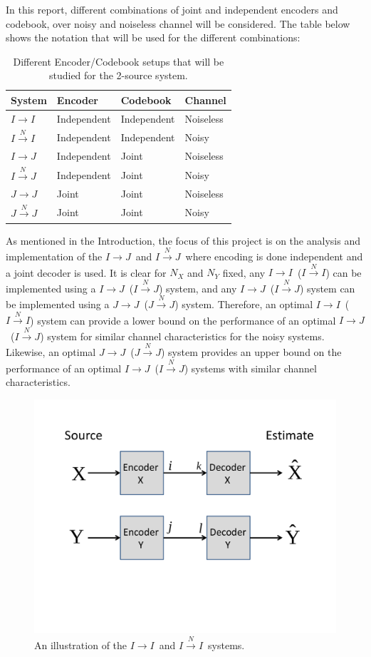 \documentclass[10pt,twoside,titlepage]{article}
\newcommand{\sysIIN}{\mbox{$I \overset{N}{\rightarrow} I$}}
\newcommand{\sysII}{\mbox{$I \rightarrow I$}}
\newcommand{\sysIJN}{\mbox{$I \overset{N}{\rightarrow} J$}}
\newcommand{\sysIJ}{\mbox{$I \rightarrow J$}}
\newcommand{\sysJJN}{\mbox{$J \overset{N}{\rightarrow} J$}}
\newcommand{\sysJJ}{\mbox{$J \rightarrow J$}}
\begin{document}
In this report, different combinations of joint and independent encoders and codebook, over noisy and noiseless channel will be considered. The table below shows the notation that will be used for the different combinations:

\begin{table}
\begin{center}
    \begin{tabular}{| l | l | l | l |}
    \hline
    \bf System & \bf Encoder & \bf Codebook & \bf Channel \\ \hline \hline
    \sysII & Independent & Independent & Noiseless \\ \hline
    \sysIIN & Independent & Independent & Noisy \\ \hline
    \sysIJ & Independent & Joint & Noiseless \\ \hline
    \sysIJN & Independent & Joint & Noisy \\ \hline
    \sysJJ & Joint & Joint & Noiseless \\ \hline
    \sysJJN & Joint & Joint & Noisy \\ \hline
    \end{tabular}
    \caption{Different Encoder/Codebook setups that will be studied for the 2-source system.}
\end{center}
\end{table}

As mentioned in the Introduction, the focus of this project is on the analysis and implementation of the \sysIJ\ and \sysIJN ~where encoding is done independent and a joint decoder is used. It is clear for $N_X$ and $N_Y$ fixed, any \sysII\ (\sysIIN) can be implemented using a \sysIJ\ (\sysIJN) system, and any \sysIJ\ (\sysIJN) system can be implemented using a \sysJJ\ (\sysJJN) system. Therefore, an optimal \sysII\ (\sysIIN) system can  provide a lower bound on the performance of an optimal \sysIJ\ (\sysIJN) system for similar channel characteristics for the noisy systems. Likewise, an optimal \sysJJ\ (\sysJJN) system provides an upper bound on the performance of an optimal \sysIJ\ (\sysIJN) systems with similar channel characteristics.

\begin{figure}
        \centering
        \includegraphics[width=0.4\linewidth]{II.pdf}
    \caption{An illustration of the \sysII\ and \sysIIN\ systems.}
    \label{fig:II_sys}
\end{figure}
\end{document}
